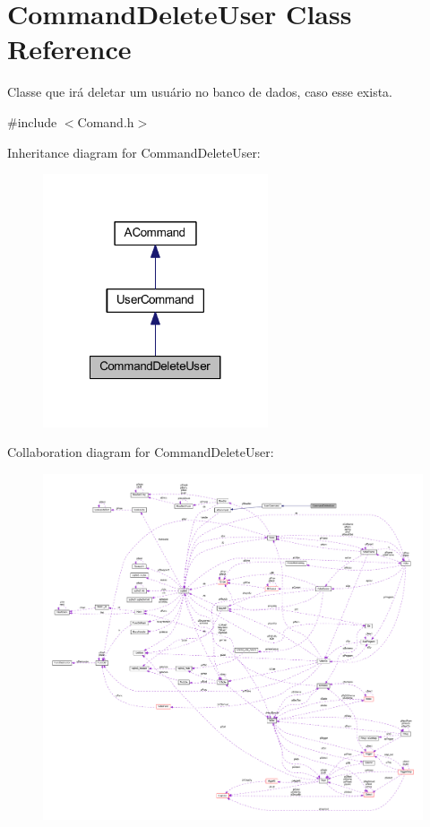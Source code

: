 \hypertarget{class_command_delete_user}{\section{Command\-Delete\-User Class Reference}
\label{class_command_delete_user}
}


Classe que irá deletar um usuário no banco de dados, caso esse exista.  




{\ttfamily \#include $<$Comand.\-h$>$}



Inheritance diagram for Command\-Delete\-User\-:\nopagebreak
\begin{figure}[H]
\begin{center}
\leavevmode
\includegraphics[width=188pt]{class_command_delete_user__inherit__graph}
\end{center}
\end{figure}


Collaboration diagram for Command\-Delete\-User\-:\nopagebreak
\begin{figure}[H]
\begin{center}
\leavevmode
\includegraphics[width=350pt]{class_command_delete_user__coll__graph}
\end{center}
\end{figure}
